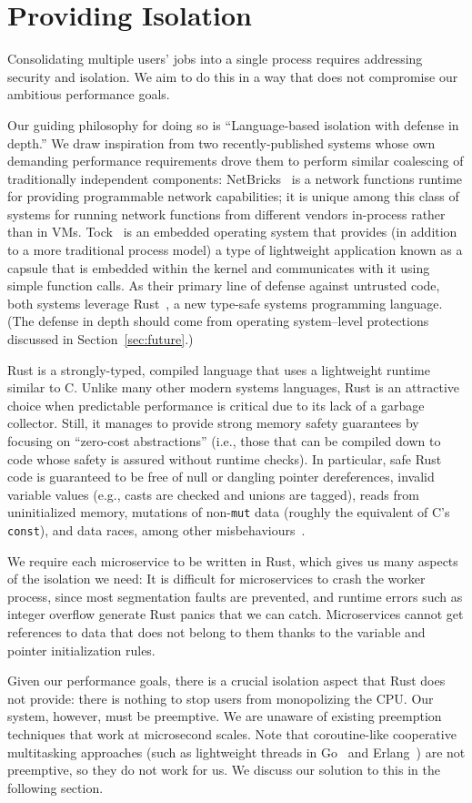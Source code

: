 \section{Providing Isolation}
\label{sec:isolation}

Consolidating multiple users' jobs into a single process requires
addressing security and isolation. We aim to do this in a way that does not
compromise our ambitious performance goals.

Our guiding philosophy for doing so is ``Language-based isolation with defense in depth.''
We draw inspiration from two recently-published systems whose own demanding
performance requirements drove them to perform similar coalescing of traditionally
independent components:  NetBricks~\cite{Panda2016} is a network functions runtime
for providing programmable network capabilities; it is unique among this class of
systems for running network functions from different vendors in-process rather than in VMs.
Tock~\cite{Levy2017} is an embedded operating system that provides (in addition to a
more traditional process model) a type of lightweight application known as a capsule
that is embedded within the kernel and communicates with it using simple function
calls.  As their primary line of defense against untrusted code, both systems
leverage Rust~\cite{www-rustlang}, a new type-safe systems programming language.
(The defense in depth should come from operating system--level protections discussed
in Section~\ref{sec:future}.)

Rust is a strongly-typed, compiled language that uses a lightweight runtime
similar to C.  Unlike many other modern systems languages, Rust is an
attractive choice when predictable performance is critical due to its
lack of a garbage collector.  Still, it manages to provide strong memory safety
guarantees by focusing on ``zero-cost abstractions'' (i.e., those that can be
compiled down to code whose safety is assured without runtime checks).  In
particular, safe Rust code is guaranteed to be free of null or dangling pointer
dereferences, invalid variable values (e.g., casts are checked and unions are
tagged), reads from uninitialized memory, mutations of non-\texttt{mut} data (roughly
the equivalent of C's \texttt{const}), and data races, among other
misbehaviours~\cite{www-rustlang-ub}.

We require each microservice to be written in Rust, which gives us many aspects of
the isolation we need:  It is difficult for microservices to crash the worker process,
since most segmentation faults are prevented, and runtime errors such as integer
overflow generate Rust panics that we can catch.  Microservices cannot get references
to data that does not belong to them thanks to the variable and pointer initialization
rules.

Given our performance goals, there is a crucial isolation aspect that
Rust does not provide: there is nothing to stop users from monopolizing the CPU\@.
Our system, however, must be preemptive. We are unaware of existing preemption
techniques that work at microsecond scales. Note that coroutine-like
cooperative multitasking approaches (such as lightweight threads in
Go~\cite{www-golang} and Erlang~\cite{www-erlang}) are not preemptive, so they
do not work for us. We discuss our solution to this in the following section.
